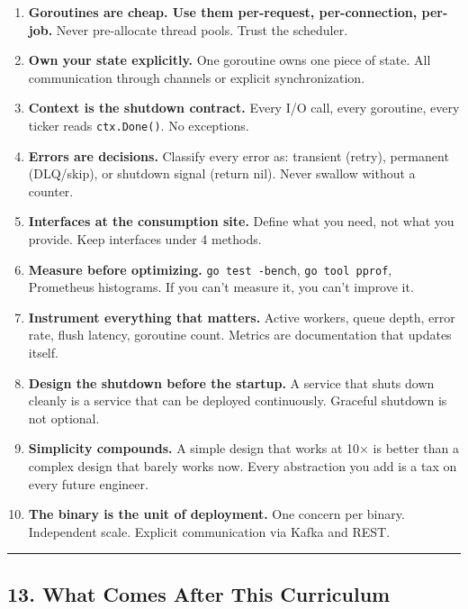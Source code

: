 \documentclass[
]{article}
\begin{document}
\begin{enumerate}
\def\labelenumi{\arabic{enumi}.}
\item
  \textbf{Goroutines are cheap. Use them per-request, per-connection,
  per-job.} Never pre-allocate thread pools. Trust the scheduler.
\item
  \textbf{Own your state explicitly.} One goroutine owns one piece of
  state. All communication through channels or explicit synchronization.
\item
  \textbf{Context is the shutdown contract.} Every I/O call, every
  goroutine, every ticker reads \texttt{ctx.Done()}. No exceptions.
\item
  \textbf{Errors are decisions.} Classify every error as: transient
  (retry), permanent (DLQ/skip), or shutdown signal (return nil). Never
  swallow without a counter.
\item
  \textbf{Interfaces at the consumption site.} Define what you need, not
  what you provide. Keep interfaces under 4 methods.
\item
  \textbf{Measure before optimizing.} \texttt{go\ test\ -bench},
  \texttt{go\ tool\ pprof}, Prometheus histograms. If you can't measure
  it, you can't improve it.
\item
  \textbf{Instrument everything that matters.} Active workers, queue
  depth, error rate, flush latency, goroutine count. Metrics are
  documentation that updates itself.
\item
  \textbf{Design the shutdown before the startup.} A service that shuts
  down cleanly is a service that can be deployed continuously. Graceful
  shutdown is not optional.
\item
  \textbf{Simplicity compounds.} A simple design that works at 10× is
  better than a complex design that barely works now. Every abstraction
  you add is a tax on every future engineer.
\item
  \textbf{The binary is the unit of deployment.} One concern per binary.
  Independent scale. Explicit communication via Kafka and REST.
\end{enumerate}

\begin{center}\rule{0.5\linewidth}{0.5pt}\end{center}

\hypertarget{what-comes-after-this-curriculum}{%
\subsection{13. What Comes After This
Curriculum}\label{what-comes-after-this-curriculum}}
\end{document}
